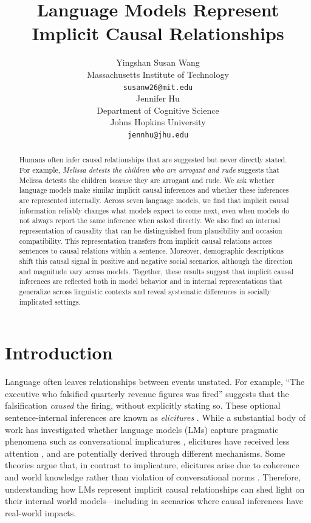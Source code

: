 \documentclass{article}
\title{Language Models Represent Implicit Causal Relationships}
\author{%
  Yingshan Susan Wang \\
  Massachusetts Institute of Technology\\
  \texttt{susanw26@mit.edu}\\
  \And
  Jennifer Hu \\
  Department of Cognitive Science\\
  Johns Hopkins University\\
  \texttt{jennhu@jhu.edu}\\
}
\begin{document}
\maketitle

\begin{abstract}
Humans often infer causal relationships that are suggested but never directly stated. For example, \emph{Melissa detests the children who are arrogant and rude}
suggests that Melissa detests the children \emph{because} they are arrogant and rude. We ask whether language models make similar implicit causal inferences and whether these inferences are represented internally. Across seven language models, we find that implicit causal information reliably changes what models expect to come next, even when models do not always report the same inference when asked directly. We also find an internal representation of causality that can be distinguished from plausibility and occasion compatibility. This representation transfers from implicit causal relations across sentences to causal relations within a sentence. Moreover, demographic descriptions shift this causal signal in positive and negative social scenarios, although the direction and magnitude vary across models. Together, these results suggest that implicit causal inferences are reflected both in model behavior and in internal representations that generalize across linguistic contexts and reveal systematic differences in socially implicated settings.

\end{abstract}

\section{Introduction}
\label{sec:introduction}

Language often leaves relationships between events unstated. For example, ``The executive who falsified quarterly revenue figures was fired'' suggests that the falsification \emph{caused} the firing, without explicitly stating so. These optional sentence-internal inferences are known as \emph{elicitures} \citep{cohen-kehler-2021-conversational}. While a substantial body of work has investigated whether language models (LMs) capture pragmatic phenomena such as conversational implicatures \citep{ruis2023goldilocks, jeretic-etal-2020-natural, schuster-etal-2020-harnessing, li-etal-2021-predicting}, elicitures have received less attention \citep[but see][]{pan-kehler-2025-pragmatic}, and are potentially derived through different mechanisms. Some theories argue that, in contrast to implicature, elicitures arise due to coherence and world knowledge rather than violation of conversational norms \citep{cohen-kehler-2021-conversational,rohde-etal-2011-anticipating}. Therefore, understanding how LMs represent implicit causal relationships can shed light on their internal world models---including in scenarios where causal inferences have real-world impacts.
\end{document}
